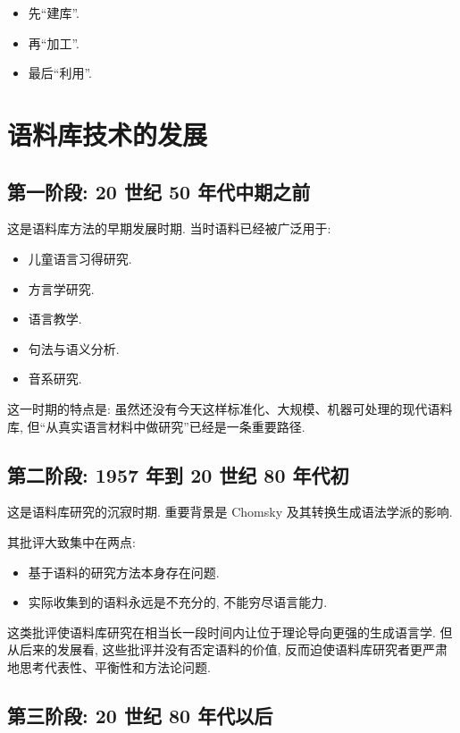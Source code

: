 \begin{itemize}
\item 先“建库”.
\item 再“加工”.
\item 最后“利用”.
\end{itemize}

\section{语料库技术的发展}


\subsection{第一阶段: 20 世纪 50 年代中期之前}


这是语料库方法的早期发展时期. 当时语料已经被广泛用于:

\begin{itemize}
\item 儿童语言习得研究.
\item 方言学研究.
\item 语言教学.
\item 句法与语义分析.
\item 音系研究.
\end{itemize}

这一时期的特点是:
虽然还没有今天这样标准化、大规模、机器可处理的现代语料库, 但“从真实语言材料中做研究”已经是一条重要路径.

\subsection{第二阶段: 1957 年到 20 世纪 80 年代初}


这是语料库研究的沉寂时期. 重要背景是 Chomsky 及其转换生成语法学派的影响.

其批评大致集中在两点:

\begin{itemize}
\item 基于语料的研究方法本身存在问题.
\item 实际收集到的语料永远是不充分的, 不能穷尽语言能力.
\end{itemize}

这类批评使语料库研究在相当长一段时间内让位于理论导向更强的生成语言学.
但从后来的发展看, 这些批评并没有否定语料的价值, 反而迫使语料库研究者更严肃地思考代表性、平衡性和方法论问题.

\subsection{第三阶段: 20 世纪 80 年代以后}


